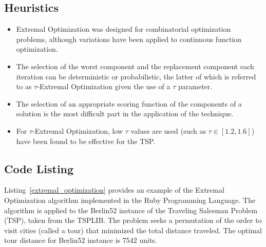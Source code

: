\subsection{Heuristics}
\begin{itemize}
	\item Extremal Optimization was designed for combinatorial optimization problems, although variations have been applied to continuous function optimization.
	\item The selection of the worst component and the replacement component each iteration can be deterministic or probabilistic, the latter of which is referred to as $\tau$-Extremal Optimization given the use of a $\tau$ parameter.
	\item The selection of an appropriate scoring function of the components of a solution is the most difficult part in the application of the technique.
	\item For $\tau$-Extremal Optimization, low $\tau$ values are used (such as $\tau \in [1.2,1.6]$) have been found to be effective for the TSP.
\end{itemize}

\subsection{Code Listing}
Listing~\ref{extremal_optimization} provides an example of the Extremal Optimization algorithm implemented in the Ruby Programming Language. 
The algorithm is applied to the Berlin52 instance of the Traveling Salesman Problem (TSP), taken from the TSPLIB. The problem seeks a permutation of the order to visit cities (called a tour) that minimized the total distance traveled. The optimal tour distance for Berlin52 instance is 7542 units.

